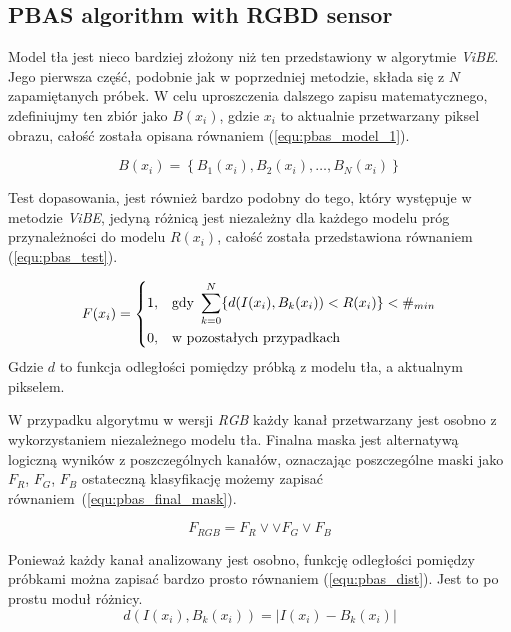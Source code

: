\documentclass[b5paper,10pt,twoside]{article}
\begin{document}
{\subsection{PBAS algorithm with RGBD sensor}
\label{subsec:pbas_rgbd}

Model tła jest nieco bardziej złożony niż ten przedstawiony w algorytmie \textit{ViBE}. Jego pierwsza część, podobnie jak w poprzedniej metodzie, składa się z $N$ zapamiętanych próbek. W celu uproszczenia dalszego zapisu matematycznego, zdefiniujmy ten zbiór jako $B(x_i)$, gdzie $x_i$ to aktualnie przetwarzany piksel obrazu, całość została opisana równaniem (\ref{equ:pbas_model_1}).

	\begin{equation}
		B(x_i)= \left\{ B_1(x_i), B_2(x_i), \dotsc, B_N(x_i) \right\}
	\label{equ:pbas_model_1}	
	\end{equation}

Test dopasowania, jest również bardzo podobny do tego, który występuje w metodzie \textit{ViBE}, jedyną różnicą jest niezależny dla każdego modelu próg przynależności do modelu $R(x_i)$, całość została przedstawiona równaniem (\ref{equ:pbas_test}).

	\begin{equation}
	    F(x_i) = 
		\begin{dcases}
    		1, & \text{gdy } \sum_{k=0}^{N} \{ d(I(x_i), B_k(x_i)) < R(x_i) \} < \#_{min} \\
    		0, & \text{w pozostałych przypadkach} 
		\end{dcases}
	\label{equ:pbas_test}	
	\end{equation}
\noindent Gdzie $d$ to funkcja odległości pomiędzy próbką z modelu tła, a aktualnym pikselem. 

W przypadku algorytmu w wersji \textit{RGB} każdy kanał przetwarzany jest osobno z wykorzystaniem niezależnego modelu tła. Finalna maska jest alternatywą logiczną wyników z poszczególnych kanałów, oznaczając poszczególne maski jako $F_R$, $F_G$, $F_B$ ostateczną klasyfikację możemy zapisać równaniem~(\ref{equ:pbas_final_mask}).

    \begin{equation}
        F_{RGB} = F_R \lor \lor F_G \lor F_B
    \label{equ:pbas_final_mask}
    \end{equation}


Ponieważ każdy kanał analizowany jest osobno, funkcję odległości pomiędzy próbkami można zapisać bardzo prosto równaniem (\ref{equ:pbas_dist}). Jest to po prostu moduł różnicy.
	\begin{equation}
		d(I(x_i),B_k(x_i)) = | I(x_i) - B_k(x_i) |
	\label{equ:pbas_dist}	
	\end{equation}

}
\end{document}
